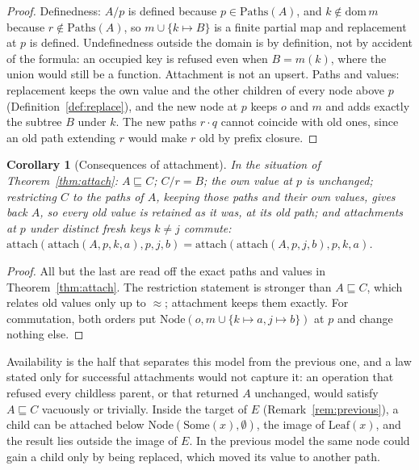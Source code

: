 \documentclass[11pt]{article}
\newtheorem{corollary}[theorem]{Corollary}
\theoremstyle{definition}
\newcommand{\Leaf}{\mathrm{Leaf}}
\newcommand{\dom}{\mathrm{dom}\,}
\newcommand{\Paths}{\mathrm{Paths}}
\begin{document}
\begin{proof}
Definedness: $A/p$ is defined because $p \in \Paths(A)$, and $k \notin \dom m$ because
$r \notin \Paths(A)$, so $m \cup \{k \mapsto B\}$ is a finite partial map and replacement at
$p$ is defined. Undefinedness outside the domain is by definition, not by accident of the
formula: an occupied key is refused even when $B = m(k)$, where the union would still be
a function. Attachment is not an upsert. Paths and
values: replacement keeps the own value and the other children of every node above $p$
(Definition~\ref{def:replace}), and the new node at $p$ keeps $o$ and $m$ and adds exactly
the subtree $B$ under $k$. The new paths $r \cdot q$ cannot coincide with old ones, since
an old path extending $r$ would make $r$ old by prefix closure.
\end{proof}

\begin{corollary}[Consequences of attachment]\label{cor:attach}
In the situation of Theorem~\ref{thm:attach}: $A \sqsubseteq C$; $C/r = B$; the own value
at $p$ is unchanged; restricting $C$ to the paths of $A$, keeping those paths and their
own values, gives back $A$, so every old value is retained as it was, at its old path; and
attachments at $p$ under distinct fresh keys
$k \neq j$ commute:
$\mathrm{attach}(\mathrm{attach}(A, p, k, a), p, j, b) =
\mathrm{attach}(\mathrm{attach}(A, p, j, b), p, k, a)$.
\end{corollary}

\begin{proof}
All but the last are read off the exact paths and values in Theorem~\ref{thm:attach}. The
restriction statement is stronger than $A \sqsubseteq C$, which relates old values only up
to $\approx$; attachment keeps them exactly. For commutation, both orders put
$\mathrm{Node}(o, m \cup \{k \mapsto a, j \mapsto b\})$ at $p$ and change nothing else.
\end{proof}

Availability is the half that separates this model from the previous one, and a law
stated only for successful attachments would not capture it: an operation that refused
every childless parent, or that returned $A$ unchanged, would satisfy $A \sqsubseteq C$
vacuously or trivially. Inside the target of $E$ (Remark~\ref{rem:previous}), a child
can be attached below $\mathrm{Node}(\mathrm{Some}(x), \emptyset)$, the image of
$\Leaf(x)$, and the result lies outside the image of $E$. In the previous model the same node could gain a child only by
being replaced, which moved its value to another path.
\end{document}
